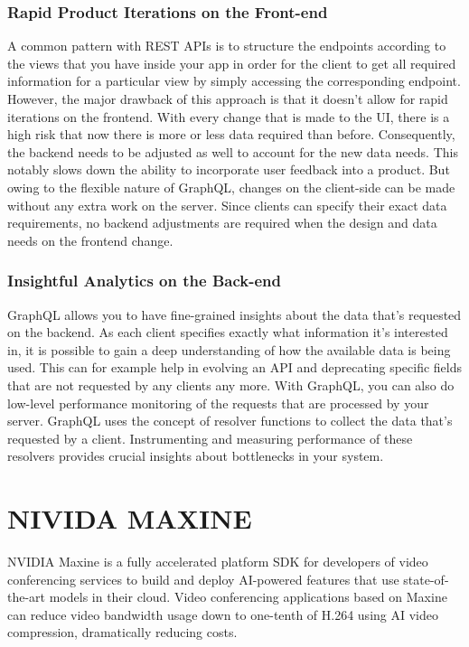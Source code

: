 \subsubsection{Rapid Product Iterations on the Front-end}

A common pattern with REST APIs is to structure the endpoints according to the views that you have inside your app 
in order for the client to get all required information for a particular view by simply accessing the corresponding 
endpoint. However, the major drawback of this approach is that it doesn’t allow for rapid iterations on the frontend. 
With every change that is made to the UI, there is a high risk that now there is more or less data required than before.
Consequently, the backend needs to be adjusted as well to account for the new data needs. This notably slows down the 
ability to incorporate user feedback into a product. But owing to the flexible nature of GraphQL, changes on the 
client-side can be made without any extra work on the server. Since clients can specify their exact data requirements, 
no backend adjustments are required when the design and data needs on the frontend change.

\subsubsection{Insightful Analytics on the Back-end}

GraphQL allows you to have fine-grained insights about the data that’s requested on the backend. As each client specifies 
exactly what information it’s interested in, it is possible to gain a deep understanding of how the available data is being 
used. This can for example help in evolving an API and deprecating specific fields that are not requested by any clients any more.
With GraphQL, you can also do low-level performance monitoring of the requests that are processed by your server. 
GraphQL uses the concept of resolver functions to collect the data that’s requested by a client. Instrumenting and measuring 
performance of these resolvers provides crucial insights about bottlenecks in your system.~\cite{GraphQLvsREST}

\section{NIVIDA MAXINE}

NVIDIA Maxine is a fully accelerated platform SDK for developers of video 
conferencing services to build and deploy AI-powered features that use state-of-the-art 
models in their cloud. Video conferencing applications based on Maxine can reduce video 
bandwidth usage down to one-tenth of H.264 using AI video compression, dramatically reducing costs.

